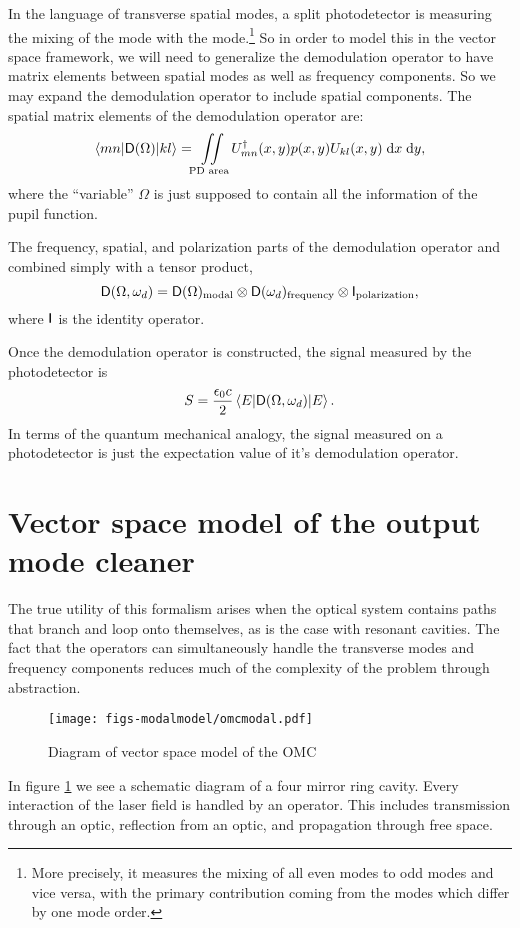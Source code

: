 
In the language of transverse spatial modes, a split photodetector is measuring the mixing of the  mode with the  mode.\footnote{More precisely, it measures the mixing of all even modes to odd modes and vice versa, with the primary contribution coming from the modes which differ by one mode order.} So in order to model this in the vector space framework, we will need to generalize the demodulation operator to have matrix elements between spatial modes as well as frequency components. %
So we may expand the demodulation operator to include spatial components. %
The spatial matrix elements of the demodulation operator are:
\begin{equation}
\matrixel{mn}{\oper{D}(\Omega)}{kl}=\iint\limits_{\text{PD area}}U_{mn}^\dagger(x,y)p(x,y)U_{kl}(x,y)\dd x \dd y,
\end{equation}
where the ``variable'' %
$\Omega$ is just supposed to contain all the information of the pupil function.

The frequency, spatial, and polarization parts of the demodulation operator and combined simply with a tensor product,
\begin{equation}
\mathsf{D}(\Omega,\omega_d) = \mathsf{D}(\Omega)_{\text{modal}}\otimes\mathsf{D}(\omega_d)_{\text{frequency}}\otimes\mathsf{I}_{\text{polarization}},
\end{equation}
where $\mathsf{I}$ is the identity operator.

Once the demodulation operator is constructed, the signal measured by the photodetector is
\begin{equation}
S=\frac{\epsilon_0 c}{2}\matrixel{E}{\oper{D}(\Omega,\omega_d)}{E}.
\end{equation}
In terms of the quantum mechanical analogy, the signal measured on a photodetector is just the expectation value of it's demodulation operator.

\section{Vector space model of the output mode cleaner}
The true utility of this formalism arises when the optical system contains paths that branch and loop onto themselves, as is the case with resonant cavities. %
The fact that the operators can simultaneously handle the transverse modes and frequency components reduces much of the complexity of the problem through abstraction.
\begin{figure}
  \begin{center}
  \leavevmode
  \texttt{[image: figs-modalmodel/omcmodal.pdf]}
  \end{center}
  \caption[Diagram of vector space model of the OMC]{Diagram of vector space model of the OMC}
  \label{fig:omcmodal}
\end{figure}
In figure \ref{fig:omcmodal} we see a schematic diagram of a four mirror ring cavity. %
Every interaction of the laser field is handled by an operator. %
This includes transmission through an optic, reflection from an optic, and propagation through free space. %


